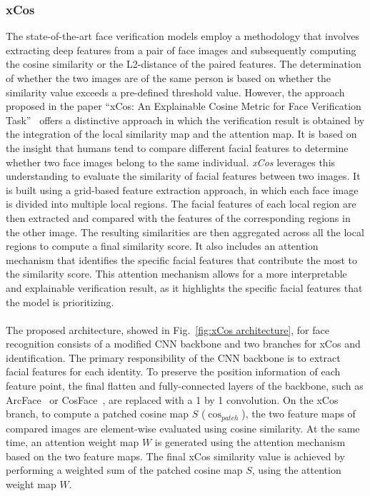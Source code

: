 \subsubsection{xCos}
\label{sec:xcos}
The state-of-the-art face verification models employ a methodology that involves extracting deep features from a pair of face images and subsequently computing the cosine similarity or the L2-distance of the paired features. The determination of whether the two images are of the same person is based on whether the similarity value exceeds a pre-defined threshold value. However, the approach proposed in the paper “xCos: An Explainable Cosine Metric for Face Verification Task”~\cite{xCos} offers a distinctive approach in which the verification result is obtained by the integration of the local similarity map and the attention map. It is based on the insight that humans tend to compare different facial features to determine whether two face images belong to the same individual. \textit{xCos} leverages this understanding to evaluate the similarity of facial features between two images. It is built using a grid-based feature extraction approach, in which each face image is divided into multiple local regions. The facial features of each local region are then extracted and compared with the features of the corresponding regions in the other image. The resulting similarities are then aggregated across all the local regions to compute a final similarity score. It also includes an attention mechanism that identifies the specific facial features that contribute the most to the similarity score. This attention mechanism allows for a more interpretable and explainable verification result, as it highlights the specific facial features that the model is prioritizing. \\ \\
%
The proposed architecture, showed in Fig.~\ref{fig:xCos architecture}, for face recognition consists of a modified CNN backbone and two branches for xCos and identification. The primary responsibility of the CNN backbone is to extract facial features for each identity. To preserve the position information of each feature point, the final flatten and fully-connected layers of the backbone, such as ArcFace~\cite{arcface2018} or CosFace~\cite{cosFace}, are replaced with a 1 by 1 convolution.
On the xCos branch, to compute a patched cosine map $S$ ($\cos_{patch}$), the two feature maps of compared images are element-wise evaluated using cosine similarity.
At the same time, an attention weight map $W$ is generated using the attention mechanism based on the two feature maps. The final xCos similarity value is achieved by performing a weighted sum of the patched cosine map $S$, using the attention weight map $W$.\\
